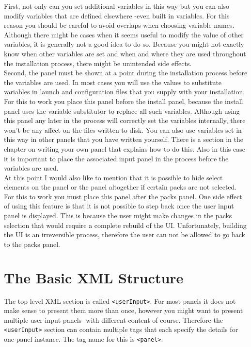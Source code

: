 First, not only can you set additional variables in this way but you can
also modify variables that are defined elsewhere -even built in
variables. For this reason you should be careful to avoid overlaps when
choosing variable names. Although there might be cases when it seems
useful to modify the value of other variables, it is generally not a
good idea to do so. Because you might not exactly know when other
variables are set and when and where they are used throughout the
installation process, there might be unintended side effects.\\

Second, the panel must be shown at a point during the installation
process before the variables are used. In most cases you will use the
values to substitute variables in launch and configuration files that
you supply with your installation. For this to work you place this panel
before the install panel, because the install panel uses the variable
substitutor to replace all such variables. Although using this panel any
later in the process will correctly set the variables internally, there
won't be any affect on the files written to disk. You can also use
variables set in this way in other panels that you have written
yourself. There is a section in the  chapter on writing your own panel
that explains how to do this. Also in this case it is important to place
the associated input panel in the process before the variables are
used.\\

At this point I would also like to mention that it is possible to hide
select elements on the panel or the panel altogether if certain packs
are not selected. For this to work you must place this panel after the
packs panel. One side effect of using this feature is that it is not
possible to step back once the user input panel is displayed. This is
because the user might make changes in the packs selection that would
require a complete rebuild of the UI. Unfortunately, building the UI is
an irreversible process, therefore the user can not be allowed to go
back to the packs panel.\\


\section{The Basic XML Structure}

The top level XML section is called \texttt{<userInput>}. For most
panels it does not make sense to present them more than once, however
you might want to present multiple user input panels -with different
content of course. Therefore the \texttt{<userInput>} section can
contain multiple tags that each specify the details for one panel
instance. The tag name for this is \texttt{<panel>}.\\

